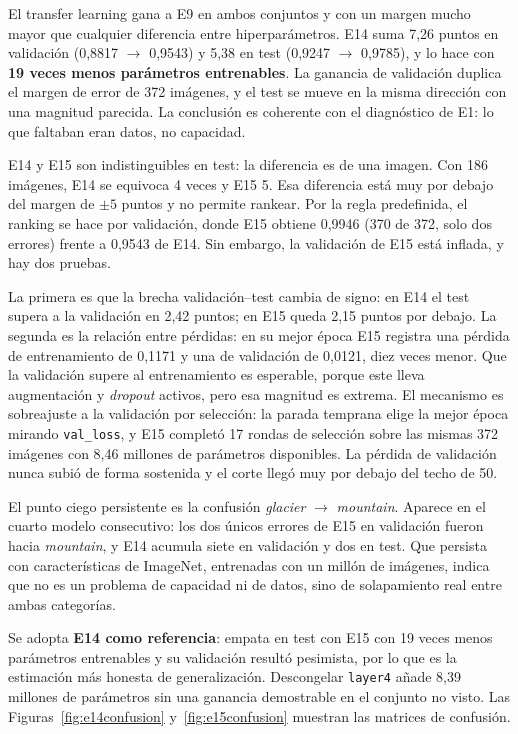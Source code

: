 \documentclass[11pt,a4paper]{article}
\begin{document}
El transfer learning gana a E9 en ambos conjuntos y con un margen mucho mayor que cualquier diferencia entre hiperparámetros. E14 suma 7,26 puntos en validación (0,8817 $\rightarrow$ 0,9543) y 5,38 en test (0,9247 $\rightarrow$ 0,9785), y lo hace con \textbf{19 veces menos parámetros entrenables}. La ganancia de validación duplica el margen de error de 372 imágenes, y el test se mueve en la misma dirección con una magnitud parecida. La conclusión es coherente con el diagnóstico de E1: lo que faltaban eran datos, no capacidad.

E14 y E15 son indistinguibles en test: la diferencia es de una imagen. Con 186 imágenes, E14 se equivoca 4 veces y E15 5. Esa diferencia está muy por debajo del margen de $\pm5$ puntos y no permite rankear. Por la regla predefinida, el ranking se hace por validación, donde E15 obtiene 0,9946 (370 de 372, solo dos errores) frente a 0,9543 de E14. Sin embargo, la validación de E15 está inflada, y hay dos pruebas.

La primera es que la brecha validación--test cambia de signo: en E14 el test supera a la validación en 2,42 puntos; en E15 queda 2,15 puntos por debajo. La segunda es la relación entre pérdidas: en su mejor época E15 registra una pérdida de entrenamiento de 0,1171 y una de validación de 0,0121, diez veces menor. Que la validación supere al entrenamiento es esperable, porque este lleva augmentación y \emph{dropout} activos, pero esa magnitud es extrema. El mecanismo es sobreajuste a la validación por selección: la parada temprana elige la mejor época mirando \texttt{val\_loss}, y E15 completó 17 rondas de selección sobre las mismas 372 imágenes con 8,46 millones de parámetros disponibles. La pérdida de validación nunca subió de forma sostenida y el corte llegó muy por debajo del techo de 50.

El punto ciego persistente es la confusión \emph{glacier} $\rightarrow$ \emph{mountain}. Aparece en el cuarto modelo consecutivo: los dos únicos errores de E15 en validación fueron hacia \emph{mountain}, y E14 acumula siete en validación y dos en test. Que persista con características de ImageNet, entrenadas con un millón de imágenes, indica que no es un problema de capacidad ni de datos, sino de solapamiento real entre ambas categorías.

Se adopta \textbf{E14 como referencia}: empata en test con E15 con 19 veces menos parámetros entrenables y su validación resultó pesimista, por lo que es la estimación más honesta de generalización. Descongelar \texttt{layer4} añade 8,39 millones de parámetros sin una ganancia demostrable en el conjunto no visto. Las Figuras~\ref{fig:e14confusion} y~\ref{fig:e15confusion} muestran las matrices de confusión.
\end{document}
